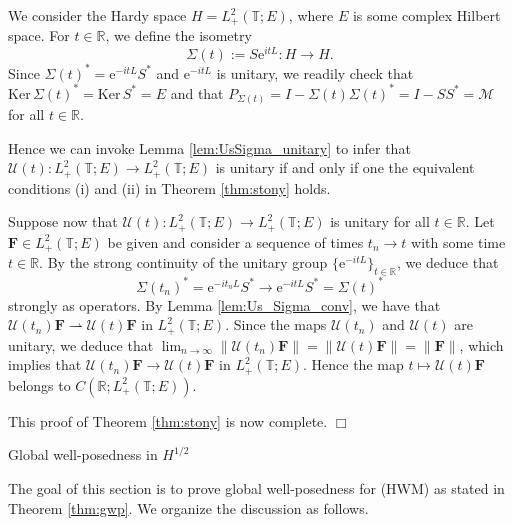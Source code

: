 \documentclass[10pt,reqno,a4paper]{amsart}
\makeatletter
\theoremstyle{definition}
\theoremstyle{remark}
\theoremstyle{remark}
\numberwithin{equation}{section}
\newcommand{\R}{\mathbb{R}}
\newcommand{\T}{\mathbb{T}}
\newcommand{\Mean}{\mathscr{M}}
\renewcommand{\ker}{\mathrm{Ker}}
\newcommand{\weakto}{\rightharpoonup}
\newcommand{\eu}{\mathrm{e}}
\newcommand{\Fb}{\mathbf{F}}
\newcommand{\id}{I}
\newcommand{\Us}{\mathscr{U}}
\def\section{\@startsection{section}{1}%
  \z@{1.5\linespacing\@plus\linespacing}{.5\linespacing}%
  {\normalfont\bfseries\large\centering}}
\makeatother
\begin{document}
We consider the Hardy space $H = L^2_+(\T;E)$, where $E$ is some complex Hilbert space. For $t \in \R$, we define the isometry 
$$
\Sigma(t) := S \eu^{it L} : H \to H.
$$ 
Since $\Sigma(t)^* = \eu^{-itL} S^*$ and $\eu^{-it L}$ is unitary, we readily check that $\ker \, \Sigma(t)^* = \ker \, S^* = E$ and that $P_{\Sigma(t)} = \id - \Sigma(t) \Sigma(t)^* = \id - S S^* = \Mean$ for all $t \in \R$.

Hence we can invoke Lemma \ref{lem:UsSigma_unitary} to infer that $\Us(t) : L^2_+(\T;E) \to L^2_+(\T;E)$ is unitary if and only if one the equivalent conditions (i) and (ii) in Theorem \ref{thm:stony} holds.

Suppose now that $\Us(t) : L^2_+(\T;E) \to L^2_+(\T;E)$ is unitary for all $t \in \R$. Let $\Fb \in L^2_+(\T; E)$ be given and consider a sequence of times $t_n \to t$ with some time $t \in \R$. By the strong continuity of the unitary group $\{ \eu^{-it L} \}_{t \in \R}$, we deduce that 
$$
\Sigma(t_n)^* = \eu^{-it_n L} S^* \to  \eu^{-it L} S^*= \Sigma(t)^*
$$ 
strongly as operators. By Lemma \ref{lem:Us_Sigma_conv}, we have that $\Us(t_n) \Fb \weakto \Us(t) \Fb$ in $L^2_+(\T;E)$. Since the maps $\Us(t_n)$ and $\Us(t)$ are unitary, we deduce that $\lim_{n \to \infty} \| \Us(t_n) \Fb \| = \|\Us(t) \Fb \| = \| \Fb \|$, which implies that $\Us(t_n) \Fb \to \Us(t) \Fb$ in $L^2_+(\T;E)$. Hence the map $t \mapsto \Us(t) \Fb$ belongs to $C(\R; L^2_+(\T;E))$.

This proof of Theorem \ref{thm:stony} is now complete. \hfill $\Box$


\section{Global well-posedness in $H^{1/2}$}
\label{sec:gwp}

The goal of this section is to prove global well-posedness for (HWM) as stated in Theorem \ref{thm:gwp}. We organize the discussion as follows.
\end{document}
